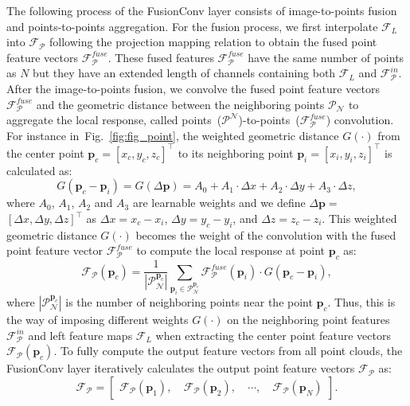 \documentclass[letterpaper, 10 pt, conference]{ieeeconf}
\newcommand{\Fref}[1]{Fig.~\textcolor{blue}{\ref{#1}}}
\begin{document}
The following process of the FusionConv layer consists of image-to-points fusion and points-to-points aggregation. For the fusion process, we first interpolate $\mathcal{F}_{L}$ into $\mathcal{F}_{\mathcal{P}}$ following the projection mapping relation to obtain the fused point feature vectors $\mathcal{F}_{\mathcal{P}}^{fuse}$. These fused features $\mathcal{F}_{\mathcal{P}}^{fuse}$ have the same number of points as $N$ but they have an extended length of channels containing both $\mathcal{F}_{L}$ and $\mathcal{F}_{\mathcal{P}}^{in}$. After the image-to-points fusion, we convolve the fused point feature vectors $\mathcal{F}_{\mathcal{P}}^{fuse}$ and the geometric distance between the neighboring points $\mathcal{P}_{\mathcal{N}}$ to aggregate the local response, called points~($\mathcal{P}^{\mathcal{N}}$)-to-points~({$\mathcal{F}_{\mathcal{P}}^{fuse}$}) convolution. For instance in~\Fref{fig:fig_point}, the weighted geometric distance $G(\cdot)$ from the center point $\textbf{p}_{c} {=} [x_{c}, y_{c}, z_{c}]^\top$ to its neighboring point $\textbf{p}_{i} {=} [x_i, y_i, z_i]^\top$ is calculated as:
\begin{equation}
    G(\textbf{p}_{c} {-} \textbf{p}_{i}) {=} G(\Delta \textbf{p}) {=} { A_{0} + A_{1}{\cdot}\Delta x + A_{2}{\cdot}\Delta y + A_{3}{\cdot}\Delta z,}
    \label{eq:geometric distance}
\end{equation}
where $A_{0}$, $A_{1}$, $A_{2}$ and $A_{3}$ are learnable weights and we define $\Delta \textbf{p} {=}$ $[\Delta x, \Delta y, \Delta z]^\top$ as $\Delta x {=} x_c {-} x_i$, $\Delta y {=} y_c {-} y_i$, and $\Delta z {=} z_c {-} z_i$.
This weighted geometric distance $G(\cdot)$ becomes the weight of the convolution with the fused point feature vector $\mathcal{F}_{\mathcal{P}}^{fuse}$ to compute the local response at point $\textbf{p}_{c}$ as: \begin{equation}
\mathcal{F}_{\mathcal{P}}(\textbf{p}_{c}) =
    \frac{1}{| \mathcal{P}_{\mathcal{N}}^{{\mathbf{p}_c}} | }
    \sum_{\textbf{p}_{i}\in \mathcal{P}_{\mathcal{N}}^{{\mathbf{p}_c}}} 
    \mathcal{F}^{fuse}_{\mathcal{P}}(\textbf{p}_{i}) \cdot G(\textbf{p}_{c} - \textbf{p}_{i}),
\end{equation}
where $| \mathcal{P}_{\mathcal{N}}^{\mathbf{p}_c} |$ is the number of neighboring points near the point $\textbf{p}_{c}$. Thus, this is the way of imposing different weights $G(\cdot)$ on the neighboring point features $\mathcal{F}_{\mathcal{P}}^{in}$ and left feature maps $\mathcal{F}_{L}$ when extracting the center point feature vectors $\mathcal{F}_{\mathcal{P}}(\textbf{p}_{c})$. To fully compute the output feature vectors from all point clouds, the FusionConv layer iteratively calculates the output point feature vectors $\mathcal{F}_{\mathcal{P}}$ as:
\begin{equation}
    \mathcal{F}_{\mathcal{P}} =
    \begin{bmatrix}
        \mathcal{F}_{\mathcal{P}}(\textbf{p}_{1}), \ &
        \mathcal{F}_{\mathcal{P}}(\textbf{p}_{2}), \ & 
        \cdots{,} \ &
        \mathcal{F}_{\mathcal{P}}(\textbf{p}_{N})
    \end{bmatrix}.
\end{equation}
\end{document}
